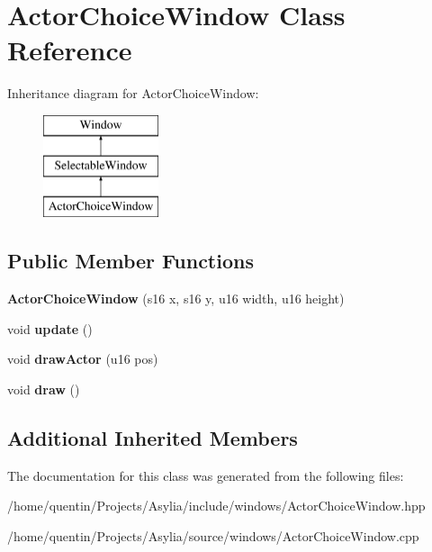 \hypertarget{classActorChoiceWindow}{\section{Actor\-Choice\-Window Class Reference}
\label{classActorChoiceWindow}
}
Inheritance diagram for Actor\-Choice\-Window\-:\begin{figure}[H]
\begin{center}
\leavevmode
\includegraphics[height=3.000000cm]{classActorChoiceWindow}
\end{center}
\end{figure}
\subsection*{Public Member Functions}
\begin{DoxyCompactItemize}
\item 
\hypertarget{classActorChoiceWindow_a49873e3cb59f9f7970b8ed598a5a7dd9}{{\bfseries Actor\-Choice\-Window} (s16 x, s16 y, u16 width, u16 height)}\label{classActorChoiceWindow_a49873e3cb59f9f7970b8ed598a5a7dd9}

\item 
\hypertarget{classActorChoiceWindow_a2e78b977b6d1162de3b7810d91c178e3}{void {\bfseries update} ()}\label{classActorChoiceWindow_a2e78b977b6d1162de3b7810d91c178e3}

\item 
\hypertarget{classActorChoiceWindow_af4a4e8b9c02fbd986de9117c633d1f81}{void {\bfseries draw\-Actor} (u16 pos)}\label{classActorChoiceWindow_af4a4e8b9c02fbd986de9117c633d1f81}

\item 
\hypertarget{classActorChoiceWindow_a4517b46c73ba16ab8ed00ca57a71b11e}{void {\bfseries draw} ()}\label{classActorChoiceWindow_a4517b46c73ba16ab8ed00ca57a71b11e}

\end{DoxyCompactItemize}
\subsection*{Additional Inherited Members}


The documentation for this class was generated from the following files\-:\begin{DoxyCompactItemize}
\item 
/home/quentin/\-Projects/\-Asylia/include/windows/Actor\-Choice\-Window.\-hpp\item 
/home/quentin/\-Projects/\-Asylia/source/windows/Actor\-Choice\-Window.\-cpp\end{DoxyCompactItemize}
